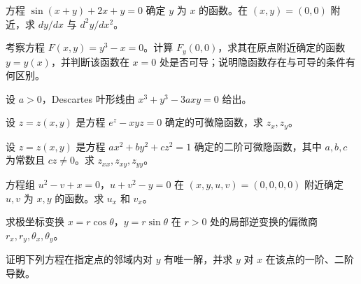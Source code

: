 \newpage
\noindent\begin{minipage}{\textwidth}
方程 $\sin(x+y)+2x+y=0$ 确定 $y$ 为 $x$ 的函数。在 $(x,y)=(0,0)$ 附近，求 $dy/dx$ 与 $d^2y/dx^2$。
\end{minipage}\par\vfill
\noindent\begin{minipage}{\textwidth}
考察方程 $F(x,y)=y^3-x=0$。计算 $F_y(0,0)$，求其在原点附近确定的函数 $y=y(x)$，并判断该函数在 $x=0$ 处是否可导；说明隐函数存在与可导的条件有何区别。
\end{minipage}\par\vfill
\noindent\begin{minipage}{\textwidth}
设 $a>0$，Descartes 叶形线由 $x^3+y^3-3axy=0$ 给出。
\end{minipage}\par\vfill
\noindent\begin{minipage}{\textwidth}
设 $z=z(x,y)$ 是方程 $e^z-xyz=0$ 确定的可微隐函数，求 $z_x,z_y$。
\end{minipage}\par\vfill
\newpage
\noindent\begin{minipage}{\textwidth}
设 $z=z(x,y)$ 是方程 $ax^2+by^2+cz^2=1$ 确定的二阶可微隐函数，其中 $a,b,c$ 为常数且 $cz\ne0$。求 $z_{xx},z_{xy},z_{yy}$。
\end{minipage}\par\vfill
\noindent\begin{minipage}{\textwidth}
方程组 $u^2-v+x=0$，$u+v^2-y=0$ 在 $(x,y,u,v)=(0,0,0,0)$ 附近确定 $u,v$ 为 $x,y$ 的函数。求 $u_x$ 和 $v_x$。
\end{minipage}\par\vfill
\noindent\begin{minipage}{\textwidth}
求极坐标变换 $x=r\cos\theta$，$y=r\sin\theta$ 在 $r>0$ 处的局部逆变换的偏微商 $r_x,r_y,\theta_x,\theta_y$。
\end{minipage}\par\vfill
\noindent\begin{minipage}{\textwidth}
证明下列方程在指定点的邻域内对 $y$ 有唯一解，并求 $y$ 对 $x$ 在该点的一阶、二阶导数。
\end{minipage}\par\vfill
